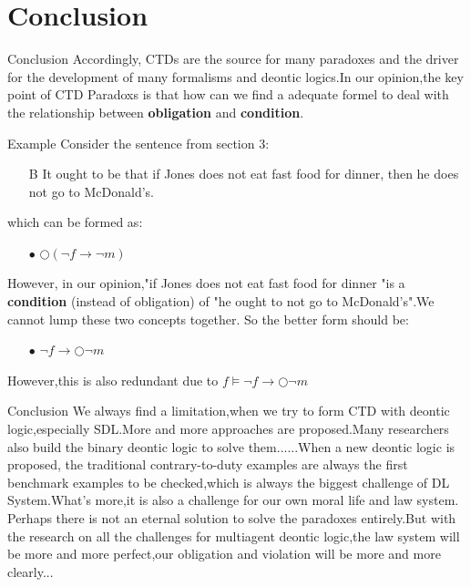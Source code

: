 \documentclass{beamer}
\begin{document}
\section{Conclusion}
\begin{frame}{Conclusion}
Accordingly, CTDs are the source for many paradoxes and the driver for the
development of many formalisms and deontic logics.In our opinion,the key point of CTD Paradoxs  is that how can we find a adequate formel to deal with the relationship between \textbf{obligation} and \textbf{condition}.
\end{frame}
\begin{frame}{Example}
Consider the sentence from section 3:
\begin{enumerate}
\item[B] It ought to be that if Jones does not eat fast food for dinner, then he does not go to McDonald’s.
\end{enumerate}
which can be formed as:
\begin{enumerate}
\item[$\bullet $]$\bigcirc (\neg f \rightarrow\neg m)$
\end{enumerate}

However, in our opinion,"if Jones does not eat fast food for dinner "is a \textbf{condition} (instead of obligation) of "he ought to not go to McDonald's".We cannot lump these two concepts together.
So the better form should be:
\begin{enumerate}
\item[$\bullet$]$ \neg f \rightarrow \bigcirc \neg m$
\end{enumerate}
However,this is also redundant due to $f \vDash\neg f \rightarrow \bigcirc \neg m $
\end{frame}
\begin{frame}{Conclusion}
We always find a limitation,when we try to form CTD with deontic logic,especially SDL.More and more approaches are proposed.Many researchers also build the binary deontic logic to solve them......When a new deontic logic is proposed, the traditional contrary-to-duty examples are always the first benchmark examples to be checked,which is always the biggest challenge of DL System.What's more,it is also a challenge for our own moral life and law system.\\
Perhaps there is not an eternal solution to solve the paradoxes entirely.But with the research on all the challenges for multiagent deontic logic,the law system will be more and more perfect,our obligation and violation will be more and more clearly... 
\end{frame}
\end{document}
